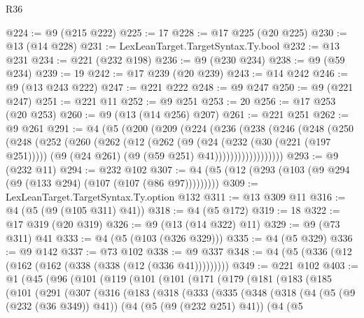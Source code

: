 \begin{lexlean}{R36}
\begin{coremodule}
{{{{{{{{{{{{{{{{{{{{{{{{{{{{{{{{{{{{{{{{{{{{{{{{{{{{{{{{{{{{{{{{{{{{{{{{{{{{{{{{{{@224 := @9 (@215 @222)
@225 := 17
@228 := @17 @225 (@20 @225)
@230 := @13 (@14 @228)
@231 := LexLeanTarget.TargetSyntax.Ty.bool
@232 := @13 @231
@234 := @221 (@232 @198)
@236 := @9 (@230 @234)
@238 := @9 (@59 @234)
@239 := 19
@242 := @17 @239 (@20 @239)
@243 := @14 @242
@246 := @9 (@13 @243 @222)
@247 := @221 @222
@248 := @9 @247
@250 := @9 (@221 @247)
@251 := @221 @11
@252 := @9 @251
@253 := 20
@256 := @17 @253 (@20 @253)
@260 := @9 (@13 (@14 @256) @207)
@261 := @221 @251
@262 := @9 @261
@291 := @4
    (@5
      (@200
        (@209
          (@224
            (@236
              (@238
                (@246
                  (@248
                    (@250
                      (@248
                        (@252
                          (@260
                            (@262
                              (@12
                                (@262
                                  (@9
                                    (@24 (@232 (@30 (@221 (@197 @251)))))
                                    (@9 (@24 @261) (@9 (@59 @251) @41))))))))))))))))))
@293 := @9 (@232 @11)
@294 := @232 @102
@307 := @4 (@5 (@12 (@293 (@103 (@9 @294 (@9 (@133 @294) (@107 (@107 (@86 @97)))))))))
@309 := LexLeanTarget.TargetSyntax.Ty.option @132
@311 := @13 @309 @11
@316 := @4 (@5 (@9 (@105 @311) @41))
@318 := @4 (@5 @172)
@319 := 18
@322 := @17 @319 (@20 @319)
@326 := @9 (@13 (@14 @322) @11)
@329 := @9 (@73 @311) @41
@333 := @4 (@5 (@103 (@326 @329)))
@335 := @4 (@5 @329)
@336 := @9 @142
@337 := @73 @102
@338 := @9 @337
@348 := @4 (@5 (@336 (@12 (@162 (@162 (@338 (@338 (@12 (@336 @41)))))))))
@349 := @221 @102
@403 := @1
    (@45
      (@96
        (@101
          (@119
            (@101
              (@101
                (@171
                  (@179
                    (@181
                      (@183
                        (@185
                          (@101
                            (@291
                              (@307
                                (@316
                                  (@183
                                    (@318
                                      (@333
                                        (@335
                                          (@348
                                            (@318
                                              (@4
                                                (@5 (@9 (@232 (@36 @349)) @41))
                                                (@4
                                                  (@5 (@9 (@232 @251) @41))
                                                  (@4
                                                    (@5
}}}}}}}}}}}}}}}}}}}}}}}}}}}}}}}}}}}}}}}}}}}}}}}}}}}}}}}}}}}}}}}}}}}}}}}}}}}}}}}}}}
\end{coremodule}
\end{lexlean}
